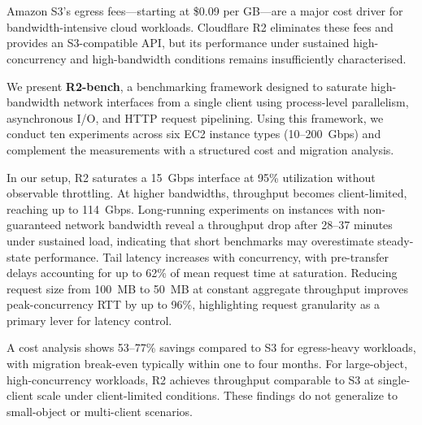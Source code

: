 \chapter*{\abstractname}

Amazon S3’s egress fees—starting at \$0.09 per GB—are a major cost driver for bandwidth-intensive cloud workloads. Cloudflare R2 eliminates these fees and provides an S3-compatible API, but its performance under sustained high-concurrency and high-bandwidth conditions remains insufficiently characterised.

We present \textbf{R2-bench}, a benchmarking framework designed to saturate high-bandwidth network interfaces from a single client using process-level parallelism, asynchronous I/O, and HTTP request pipelining. Using this framework, we conduct ten experiments across six EC2 instance types (10--200~Gbps) and complement the measurements with a structured cost and migration analysis.

In our setup, R2 saturates a 15~Gbps interface at 95\% utilization without observable throttling. At higher bandwidths, throughput becomes client-limited, reaching up to 114~Gbps. Long-running experiments on instances with non-guaranteed network bandwidth reveal a throughput drop after 28--37 minutes under sustained load, indicating that short benchmarks may overestimate steady-state performance. Tail latency increases with concurrency, with pre-transfer delays accounting for up to 62\% of mean request time at saturation. Reducing request size from 100~MB to 50~MB at constant aggregate throughput improves peak-concurrency RTT by up to 96\%, highlighting request granularity as a primary lever for latency control.

A cost analysis shows 53--77\% savings compared to S3 for egress-heavy workloads, with migration break-even typically within one to four months. For large-object, high-concurrency workloads, R2 achieves throughput comparable to S3 at single-client scale under client-limited conditions. These findings do not generalize to small-object or multi-client scenarios.














